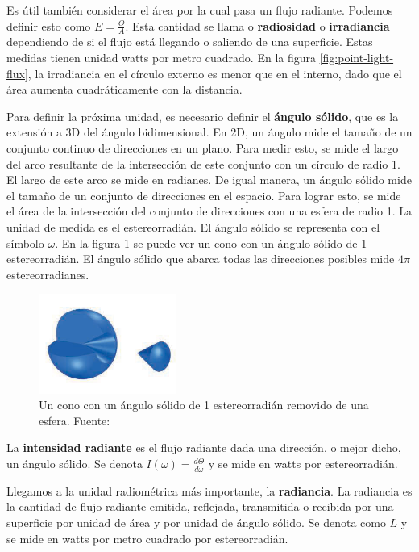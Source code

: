 Es útil también considerar el área por la cual pasa un flujo radiante.
Podemos definir esto como $E = \frac{\Theta}{A}$.
Esta cantidad se llama o \textbf{radiosidad} o \textbf{irradiancia} dependiendo de si el flujo está llegando o saliendo de una superficie.
Estas medidas tienen unidad watts por metro cuadrado.
En la figura \ref{fig:point-light-flux}, la irradiancia en el círculo externo es menor que en el interno, dado que el área aumenta cuadráticamente con la distancia.

Para definir la próxima unidad, es necesario definir el \textbf{ángulo sólido}, que es la extensión a 3D del ángulo bidimensional.
En 2D, un ángulo mide el tamaño de un conjunto continuo de direcciones en un plano.
Para medir esto, se mide el largo del arco resultante de la intersección de este conjunto con un círculo de radio 1.
El largo de este arco se mide en radianes.
De igual manera, un ángulo sólido mide el tamaño de un conjunto de direcciones en el espacio.
Para lograr esto, se mide el área de la intersección del conjunto de direcciones con una esfera de radio 1.
La unidad de medida es el estereorradián.
El ángulo sólido se representa con el símbolo $\omega$.
En la figura \ref{fig:steradian} se puede ver un cono con un ángulo sólido de 1 estereorradián.
El ángulo sólido que abarca todas las direcciones posibles mide $4\pi$ estereorradianes.

\begin{figure}[ht]
    \centering
    \includegraphics[width=0.4\textwidth]{steradians.png}
    \caption{Un cono con un ángulo sólido de 1 estereorradián removido de una esfera. Fuente: \cite{rtr}}
    \label{fig:steradian}
\end{figure}

La \textbf{intensidad radiante} es el flujo radiante dada una dirección, o mejor dicho, un ángulo sólido.
Se denota $I(\omega) = \frac{d\Theta}{d\omega}$ y se mide en watts por estereorradián.

Llegamos a la unidad radiométrica más importante, la \textbf{radiancia}.
La radiancia es la cantidad de flujo radiante emitida, reflejada, transmitida o recibida por una superficie por unidad de área y por unidad de ángulo sólido.
Se denota como $L$ y se mide en watts por metro cuadrado por estereorradián.


